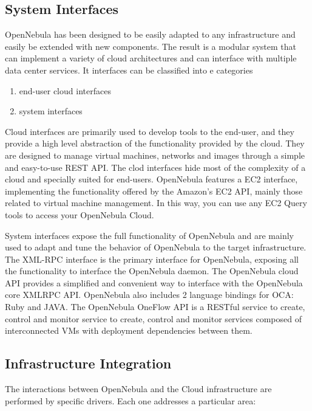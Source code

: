 \documentclass[9pt,twocolumn,twoside]{../../styles/osajnl}
\begin{document}
\subsection{System Interfaces}
OpenNebula has been designed to be easily adapted to any 
infrastructure and easily be extended with new components. The result 
is a modular system that can implement a variety of cloud 
architectures and can interface with multiple data center services. 
It interfaces can be classified into e categories

\begin{enumerate}
	\item end-user cloud interfaces
	\item system interfaces
\end{enumerate}

Cloud interfaces are primarily used to develop tools to the end-user, 
and they provide a high level abstraction of the functionality 
provided by the cloud. They are designed to manage virtual machines, 
networks and images through a simple and easy-to-use REST API. The 
clod interfaces hide most of the complexity of a cloud and specially 
suited for end-users. OpenNebula features a EC2 interface, 
implementing the functionality offered by the Amazon's EC2 API, 
mainly those related to virtual machine management. In this way, you 
can use any EC2 Query tools to access your OpenNebula Cloud.

{System interfaces}\cite{www-opennebula-systeminterfaces} expose the 
full functionality of OpenNebula and are 
mainly used to adapt and tune the behavior of OpenNebula to the 
target infrastructure. The XML-RPC interface is the primary interface 
for OpenNebula, exposing all the functionality to interface the 
OpenNebula daemon. The OpenNebula cloud API provides a simplified and 
convenient way to interface with the OpenNebula core XMLRPC API. 
OpenNebula also includes 2 language bindings for OCA: Ruby and JAVA. 
The OpenNebula OneFlow API is a RESTful service to create, control 
and monitor service to create, control and monitor services composed 
of interconnected VMs with deployment dependencies between them.

\subsection{Infrastructure Integration}

The interactions between OpenNebula and the {Cloud 
infrastructure}\cite{www-opennebula-infraintegration} are 
performed by specific drivers. Each one addresses a particular area:
\end{document}
